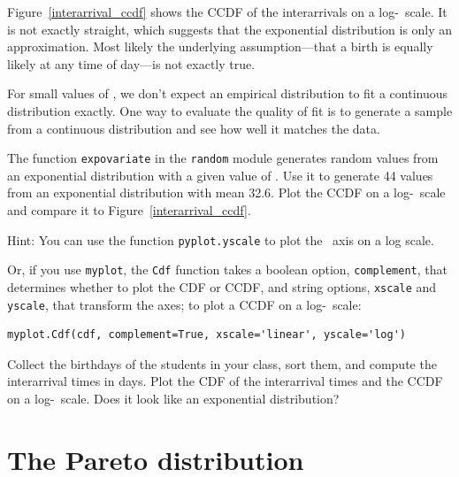 \documentclass[12pt]{book}
\begin{document}
Figure~\ref{interarrival_ccdf} shows the CCDF of the interarrivals
on a log-\y~scale.  It is not exactly straight, which suggests that
the exponential distribution is only an approximation.  Most likely
the underlying assumption---that a birth is equally likely at any time
of day---is not exactly true.

\begin{exercise}
For small values of \n, we don't expect an empirical distribution
to fit a continuous distribution exactly.  One way to evaluate
the quality of fit is to generate a sample from a continuous
distribution and see how well it matches the data.

The function {\tt expovariate} in the {\tt random} module generates
random values from an exponential distribution with a given value of
\mylambda.  Use it to generate 44 values from an exponential
distribution with mean 32.6.  Plot the CCDF on a log-\y~scale and
compare it to Figure~\ref{interarrival_ccdf}.

Hint: You can use the function {\tt pyplot.yscale} to plot the \y~axis
on a log scale.


Or, if you use {\tt myplot}, the {\tt Cdf} function takes a boolean
option, {\tt complement}, that determines whether to plot the CDF or
CCDF, and string options, {\tt xscale} and {\tt yscale}, that
transform the axes; to plot a CCDF on a log-\y~scale:
%
\begin{verbatim}
myplot.Cdf(cdf, complement=True, xscale='linear', yscale='log') 
\end{verbatim}

\end{exercise}

\begin{exercise}
Collect the birthdays of the students in your class, sort them, and
compute the interarrival times in days.  Plot the CDF of the interarrival
times and the CCDF on a log-\y~scale.  Does it look like
an exponential distribution?

\end{exercise}


\section{The Pareto distribution}
\end{document}
